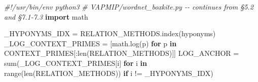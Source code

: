 \documentclass[
  10pt,
]{article}
\newenvironment{Shaded}{}{}
\newcommand{\BuiltInTok}[1]{\textcolor[rgb]{0.00,0.50,0.00}{#1}}
\newcommand{\CommentTok}[1]{\textcolor[rgb]{0.38,0.63,0.69}{\textit{#1}}}
\newcommand{\ControlFlowTok}[1]{\textcolor[rgb]{0.00,0.44,0.13}{\textbf{#1}}}
\newcommand{\ImportTok}[1]{\textcolor[rgb]{0.00,0.50,0.00}{\textbf{#1}}}
\newcommand{\KeywordTok}[1]{\textcolor[rgb]{0.00,0.44,0.13}{\textbf{#1}}}
\newcommand{\NormalTok}[1]{#1}
\newcommand{\OperatorTok}[1]{\textcolor[rgb]{0.40,0.40,0.40}{#1}}
\newcommand{\StringTok}[1]{\textcolor[rgb]{0.25,0.44,0.63}{#1}}
\begin{document}
\begin{Shaded}
\begin{Highlighting}[]
\CommentTok{\#!/usr/bin/env python3}
\CommentTok{\# VAPMIP/wordnet\_boxkite.py {-}{-} continues from §5.2 and §7.1{-}7.3}
\ImportTok{import}\NormalTok{ math}

\NormalTok{\_HYPONYMS\_IDX }\OperatorTok{=}\NormalTok{ RELATION\_METHODS.index(}\StringTok{\textquotesingle{}hyponyms\textquotesingle{}}\NormalTok{)}
\NormalTok{\_LOG\_CONTEXT\_PRIMES }\OperatorTok{=}\NormalTok{ [math.log(p) }\ControlFlowTok{for}\NormalTok{ p }\KeywordTok{in}\NormalTok{ CONTEXT\_PRIMES[:}\BuiltInTok{len}\NormalTok{(RELATION\_METHODS)]]}
\NormalTok{LOG\_ANCHOR }\OperatorTok{=} \BuiltInTok{sum}\NormalTok{(\_LOG\_CONTEXT\_PRIMES[i] }\ControlFlowTok{for}\NormalTok{ i }\KeywordTok{in} \BuiltInTok{range}\NormalTok{(}\BuiltInTok{len}\NormalTok{(RELATION\_METHODS))}
                  \ControlFlowTok{if}\NormalTok{ i }\OperatorTok{!=}\NormalTok{ \_HYPONYMS\_IDX)}


\end{Highlighting}
\end{Shaded}
\end{document}
